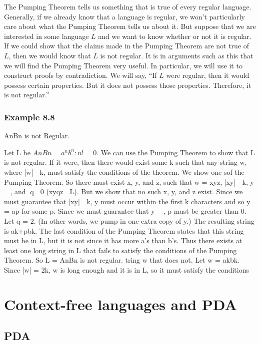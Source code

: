 \documentclass{article}
\begin{document}
The Pumping Theorem tells us something that is true of every regular language.
Generally, if we already know that a language is regular, we won’t particularly
care about what the Pumping Theorem tells us about it.  But suppose that we are
interested in some language $L$ and we want to know whether or not it is regular.
If we could show that the claims made in the Pumping Theorem are not true of $L$,
then we would know that $L$ is not regular.  It is in arguments such as this that
we will find the Pumping Theorem very useful.  In particular, we will use it to
construct proofs by contradiction.  We will say, “If $L$ were regular, then it
would possess certain properties.  But it does not possess those properties.
Therefore, it is not regular.” 


\subsubsection{Example 8.8 }

AnBn is not Regular.

Let L be $AnBn = {a^nb^n : n != 0}$.  We can use the
Pumping Theorem to show that L is not regular.  If it were, then there would
exist some k such that any string w, where |w|  k, must satisfy the conditions
of the theorem.  We show one sof the Pumping Theorem.  So there must exist x,
y, and z, such that w = xyz, |xy|  k, y  , and q  0 (xyqz  L).  But we
show that no such x, y, and z exist.  Since we must guarantee that |xy|  k, y
must occur within the first k characters and so y = ap for some p.  Since we
must guarantee that y  , p must be greater than 0.  Let q = 2. (In other
words, we pump in one extra copy of y.)  The resulting string is ak+pbk.  The
last condition of the Pumping Theorem states that this string must be in L, but
it is not since it has more a’s than b’s.  Thus there exists at least one long
string in L that fails to satisfy the conditions of the Pumping Theorem.  So L
= AnBn is not regular. tring w that does not.  Let w = akbk.  Since |w| = 2k, w
is long enough and it is in L, so it must satisfy the conditions 

\section{Context-free languages and PDA}

\subsection{PDA} 
\end{document}

